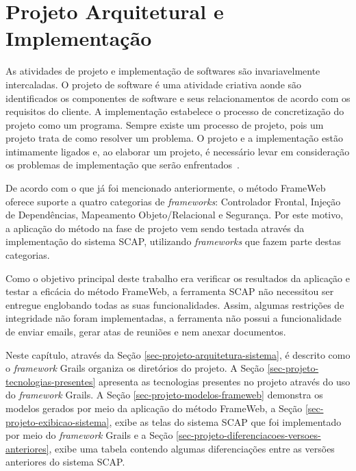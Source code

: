 \chapter{Projeto Arquitetural e Implementação}
\label{sec-projeto}

As atividades de projeto e implementação de softwares são invariavelmente intercaladas. O projeto de software é uma atividade criativa aonde são identificados os componentes de software e seus relacionamentos de acordo com os requisitos do cliente. A implementação estabelece o processo de concretização do projeto como um programa. Sempre existe um processo de projeto, pois um projeto trata de como resolver um problema. O projeto e a implementação estão intimamente ligados e, ao elaborar um projeto, é necessário levar em consideração os problemas de implementação que serão enfrentados~\cite{sommerville:es11}.

De acordo com o que já foi mencionado anteriormente, o método FrameWeb oferece suporte a quatro categorias de \textit{frameworks}: Controlador Frontal, Injeção de Dependências, Mapeamento Objeto/Relacional e Segurança. Por este motivo, a aplicação do método na fase de projeto vem sendo testada através da implementação do sistema SCAP, utilizando \textit{frameworks} que fazem parte destas categorias.

Como o objetivo principal deste trabalho era verificar os resultados da aplicação e testar a eficácia do método FrameWeb, a ferramenta SCAP não necessitou ser entregue englobando todas as suas funcionalidades. Assim, algumas restrições de integridade não foram implementadas, a ferramenta não possui a funcionalidade de enviar emails, gerar atas de reuniões e nem anexar documentos.

Neste capítulo, através da Seção \ref{sec-projeto-arquitetura-sistema}, é descrito como o \textit{framework} Grails organiza os diretórios do projeto. A Seção \ref{sec-projeto-tecnologias-presentes} apresenta as tecnologias presentes no projeto através do uso do \textit{framework} Grails. A Seção \ref{sec-projeto-modelos-frameweb} demonstra os modelos gerados por meio da aplicação do método FrameWeb, a Seção \ref{sec-projeto-exibicao-sistema}, exibe as telas do sistema SCAP que foi implementado por meio do \textit{framework} Grails e a Seção \ref{sec-projeto-diferenciacoes-versoes-anteriores}, exibe uma tabela contendo algumas diferenciações entre as versões anteriores do sistema SCAP.           


